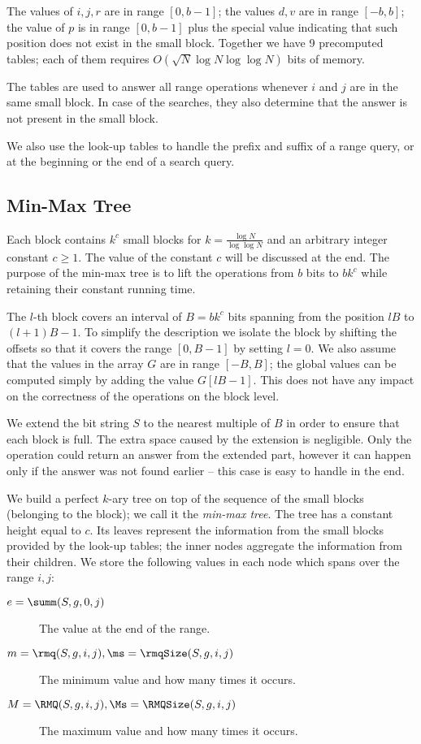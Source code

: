 The values of $i, j, r$ are in range $[0, b - 1]$; the values $d, v$ are in range $[-b, b]$; the value of $p$ is in range $[0, b - 1]$ plus the special value indicating that such position does not exist in the small block.
Together we have 9 precomputed tables; each of them requires $O(\sqrt{N} \log N \log \log N)$ bits of memory.

The tables are used to answer all range operations whenever $i$ and $j$ are in the same small block.
In case of the searches, they also determine that the answer is not present in the small block.

We also use the look-up tables to handle the prefix and suffix of a range query, or at the beginning or the end of a search query.

\subsection{Min-Max Tree}

Each block contains $k^c$ small blocks for $k = \frac{\log N}{\log \log N}$ and an arbitrary integer constant $c \ge 1$.
The value of the constant $c$ will be discussed at the end.
The purpose of the min-max tree is to lift the operations from $b$ bits to $b k^c$ while retaining their constant running time.

The $l$-th block covers an interval of $B = b k^c$ bits spanning from the position $l B$ to $(l + 1) B - 1$.
To simplify the description we isolate the block by shifting the offsets so that it covers the range $[0, B - 1]$ by setting $l = 0$.
We also assume that the values in the array $G$ are in range $[-B, B]$; the global values can be computed simply by adding the value $G[l B - 1]$.
This does not have any impact on the correctness of the operations on the block level.

We extend the bit string $S$ to the nearest multiple of $B$ in order to ensure that each block is full.
The extra space caused by the extension is negligible.
Only the \fwdSearch{} operation could return an answer from the extended part, however it can happen only if the answer was not found earlier -- this case is easy to handle in the end.

\bigbreak

We build a perfect $k$-ary tree on top of the sequence of the small blocks (belonging to the block); we call it the \emph{min-max tree}.
The tree has a constant height equal to $c$.
Its leaves represent the information from the small blocks provided by the look-up tables; the inner nodes aggregate the information from their children.
We store the following values in each node which spans over the range $i, j$:
\begin{description}
	\item[$e = \summ(S, g, 0, j)$] 
	The value at the end of the range.
	
	\item[$m = \rmq(S, g, i, j), \ms = \rmqSize(S, g, i, j)$]
	The minimum value and how many times it occurs.
	
	\item[$M = \RMQ(S, g, i, j), \Ms = \RMQSize(S, g, i, j)$]
	The maximum value and how many times it occurs.
\end{description}

